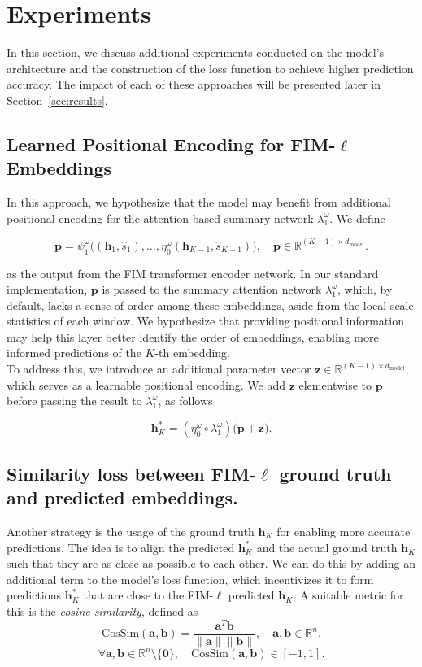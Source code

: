 \documentclass{article}
\theoremstyle{plain}
\theoremstyle{definition}
\theoremstyle{remark}
\begin{document}
\section{Experiments}
In this section, we discuss additional experiments conducted on the model's architecture and the construction of the loss function to achieve higher prediction accuracy. The impact of each of these approaches will be presented later in Section~\ref{sec:results}.

\subsection{Learned Positional Encoding for FIM-$\ell$ Embeddings}
In this approach, we hypothesize that the model may benefit from additional positional encoding for the attention-based summary network \(\lambda^{\omega}_1\). We define

\[
    \mathbf{p} =  \psi^{\omega}_1\Big(( \mathbf{h}_1, \hat{s}_1), \ldots, \eta^{\omega}_0( \mathbf{h}_{K-1}, \hat{s}_{K-1})\Big), \quad \mathbf{p} \in \mathbb{R}^{(K-1) \times d_{\text{model}}}.
\]

as the output from the FIM transformer encoder network. In our standard implementation, \(\mathbf{p}\) is passed to the summary attention network \(\lambda^{\omega}_1\), which, by default, lacks a sense of order among these embeddings, aside from the local scale statistics of each window. We hypothesize that providing positional information may help this layer better identify the order of embeddings, enabling more informed predictions of the \(K\)-th embedding.\\
To address this, we introduce an additional parameter vector \(\mathbf{z} \in \mathbb{R}^{(K-1) \times d_{\text{model}}}\), which serves as a learnable positional encoding. We add \(\mathbf{z}\) elementwise to \(\mathbf{p}\) before passing the result to \(\lambda^{\omega}_1\), as follows

\[
    \mathbf{h}^*_K = (\eta^{\omega}_0 \circ \lambda^{\omega}_1) \Big(\mathbf{p} + \mathbf{z} \Big).
\]



\subsection{Similarity loss between FIM-$\ell$ ground truth and predicted embeddings.}
Another strategy is the usage of the ground truth $\mathbf{h}_K$ for enabling more accurate predictions. The idea is to align the predicted $\mathbf{h}^*_K$ and the actual ground truth $\mathbf{h}_K$ such that they are as close as possible to each other. We can do this by adding an additional term to the model's loss function, which incentivizes it to form predictions $\mathbf{h}^*_K$ that are close to the FIM-$\ell$ predicted $\mathbf{h}_K$. A suitable metric for this is the \emph{cosine similarity}, defined as
\[
\text{CosSim}(\mathbf{a}, \mathbf{b}) = \frac{\mathbf{a}^T \mathbf{b}}{\|\mathbf{a}\| \|\mathbf{b}\|}, \quad \mathbf{a}, \mathbf{b} \in \mathbb{R}^n.
\]
\[
\forall \mathbf{a}, \mathbf{b} \in \mathbb{R}^n \setminus \{\mathbf{0}\}, \quad \text{CosSim}(\mathbf{a}, \mathbf{b}) \in [-1, 1].
\]
\end{document}
